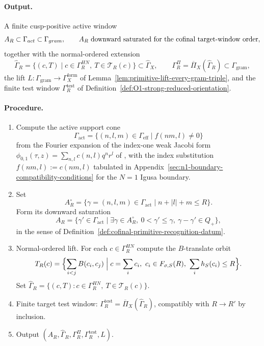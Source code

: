 \paragraph{Output.}
A finite cusp-positive active window
\[
A_R\subset\Gamma_{\mathrm{act}}\subset\Gamma_{\mathrm{gram}},
\qquad
A_R\hbox{ downward saturated for the cofinal target-window order},
\]
together with the normal-ordered extension
\[
\widehat\Gamma_R=
\{(c,T)\mid c\in\Gamma_R^{HN},\ T\in\mathcal T_R(c)\}
\subset\widehat\Gamma_X,
\qquad
\Gamma_R^\Pi=\overline\Pi_X(\widehat\Gamma_R)\subset\Gamma_{\mathrm{gram}},
\]
the lift \(L:\Gamma_{\mathrm{gram}}\to\Gamma_X^{\mathrm{form}}\) of
Lemma~\ref{lem:primitive-lift-every-gram-triple}, and the finite test
window \(\Gamma_R^{\mathrm{test}}\) of
Definition~\ref{def:O1-strong-reduced-orientation}.

\paragraph{Procedure.}
\begin{enumerate}
\item Compute the active support cone
\[
\Gamma_{\mathrm{act}}=\{(n,l,m)\in\Gamma_{\mathrm{eff}}\mid f(nm,l)\ne 0\}
\]
from the Fourier expansion of the index-one weak Jacobi form
\(\phi_{0,1}(\tau,z)=\sum_{n,l}c(n,l)q^nr^l\) of
\cite{EZ:1}, with the index substitution
\(f(nm,l):=c(nm,l)\) tabulated in
Appendix~\ref{sec:n1-boundary-compatibility-conditions} for the
\(N=1\) Igusa boundary.

\item Set
\[
A_R^{\circ}
=\{\gamma=(n,l,m)\in\Gamma_{\mathrm{act}}\mid n+|l|+m\le R\}.
\]
Form its downward saturation
\[
A_R
=\{\gamma'\in\Gamma_{\mathrm{act}}\mid
\exists\gamma\in A_R^{\circ},\ 0<\gamma'\le\gamma,\
\gamma-\gamma'\in Q_+\},
\]
in the sense of Definition~\ref{def:cofinal-primitive-recognition-datum}.

\item Normal-ordered lift.  For each \(c\in\Gamma_R^{HN}\) compute the
\(B\)-translate orbit
\[
\mathcal T_R(c)
=\Bigl\{\sum_{i<j}B(c_i,c_j)\Bigm|c=\sum_i c_i,\
c_i\in F_{\sigma,S}(R),\ \sum_i h_S(c_i)\le R\Bigr\}.
\]
Set \(\widehat\Gamma_R=\{(c,T):c\in\Gamma_R^{HN},\ T\in\mathcal T_R(c)\}\).

\item Finite target test window:
\(\Gamma_R^{\mathrm{test}}=\overline\Pi_X(\widehat\Gamma_R)\), compatibly
with \(R\to R'\) by inclusion.

\item Output \((A_R,\widehat\Gamma_R,\Gamma_R^\Pi,\Gamma_R^{\mathrm{test}},L)\).
\end{enumerate}

